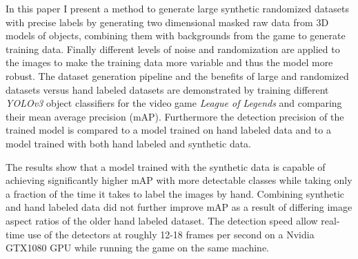 In this paper I present a method to generate large synthetic randomized datasets with precise labels by generating two dimensional masked raw data from 3D models of objects, combining them with backgrounds from the game to generate training data.
Finally different levels of noise and randomization are applied to the images to make the training data more variable and thus the model more robust.
The dataset generation pipeline and the benefits of large and randomized datasets versus hand labeled datasets are demonstrated by training different \textit{YOLOv3} object classifiers for the video game \textit{League of Legends} and comparing their mean average precision (mAP).
Furthermore the detection precision of the trained model is compared to a model trained on hand labeled data and to a model trained with both hand labeled and synthetic data.

The results show that a model trained with the synthetic data is capable of achieving significantly higher mAP with more detectable classes while taking only a fraction of the time it takes to label the images by hand.
Combining synthetic and hand labeled data did not further improve mAP as a result of differing image aspect ratios of the older hand labeled dataset.
The detection speed allow real-time use of the detectors at roughly 12-18 frames per second on a Nvidia GTX1080 GPU while running the game on the same machine.

